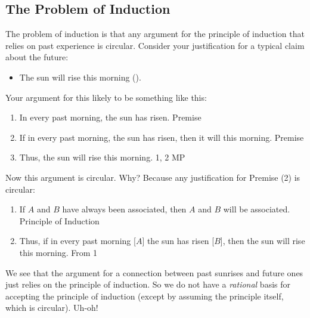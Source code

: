 \documentclass[oneside,letterpaper,12pt]{book}
\begin{document}
\subsection*{The Problem of Induction}
\par The problem of induction is that any argument for the principle of induction that relies on past experience is circular. Consider your justification for a typical claim about the future:
\begin{itemize} 
	\item The sun will rise this morning (\pageref{sun}).
\end{itemize}
Your argument for this likely to be something like this:
\begin{enumerate}
	\item In every past morning, the sun has risen. \hfill Premise
	\item If in every past morning, the sun has risen, then it will this morning. \hfill Premise
	\item Thus, the sun will rise this morning. \hfill 1, 2 MP
\end{enumerate}
Now this argument is circular. Why? Because any justification for Premise (2) is circular:
\begin{enumerate}
	\item If $A$ and $B$ have always been associated, then $A$ and $B$ will be associated. \hfill Principle of Induction
	\item Thus, if in every past morning [$A$] the sun has risen [$B$], then the sun will rise this morning. \hfill From 1
\end{enumerate}
We see that the argument for a connection between past sunrises and future ones just relies on the principle of induction. So we do not have a \textit{rational} basis for accepting the principle of induction (except by assuming the principle itself, which is circular). Uh-oh!
\end{document}
